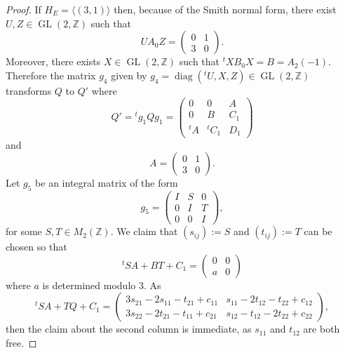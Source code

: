 \documentclass[11pt]{amsart}
\newcommand{\ZZ}{\mathbb{Z}}
\newcommand{\la}{\langle}
\newcommand{\ra}{\rangle}
\newcommand{\opn}{\operatorname}
\begin{document}
\begin{proof}
If $H_E = \la (3,1) \ra$ then, because of the Smith normal form, there exist $U, Z \in \opn{GL}(2, \ZZ)$ such that 
\begin{equation*}
U A_0 Z = 
\begin{pmatrix} 
0 & 1 \\ 
3 & 0 
\end{pmatrix}.
\end{equation*}
Moreover, there exists $X \in \opn{GL}(2, \ZZ)$ such that ${}^tX B_0 X = B = A_2(-1)$.
Therefore the matrix $g_4$ given by $g_4=\opn{diag}({}^t U, X, Z) \in \opn{GL}(2, \ZZ)$ transforms $Q$ to $Q'$ where
\begin{equation*}
Q' = 
{}^tg_1Qg_1 = 
\begin{pmatrix} 
0 & 0 & A \\ 
0 & B & C_1 \\ 
{}^t A & {}^t C_1 & D_1 
\end{pmatrix}
\end{equation*} 
and 
\begin{equation*}
A=
\begin{pmatrix} 
0 & 1 \\ 
3 & 0 
\end{pmatrix}.
\end{equation*}
Let $g_5$ be an integral matrix of the form 
\begin{equation*}
g_5=
\begin{pmatrix} 
I & S & 0 \\ 
0 & I & T \\ 
0 & 0 & I 
\end{pmatrix},
\end{equation*}
for some $S, T \in M_2(\ZZ)$. 
We claim that $(s_{ij}):=S$ and $(t_{ij}):=T$ can be chosen so that
\begin{equation*}
{}^t SA + BT + C_1 = 
\begin{pmatrix} 
0 & 0 \\ 
a & 0 
\end{pmatrix}
\end{equation*}
where $a$ is determined modulo 3. 
As 
\begin{equation}\label{normalformeq1}
{}^tSA + TQ + C_1= 
\begin{pmatrix} 3s_{21} - 2s_{11} - t_{21}  + c_{11} & s_{11} - 2t_{12} - t_{22} + c_{12} \\ 
3s_{22} - 2t_{21} - t_{11} + c_{21} & s_{12} - t_{12} - 2t_{22} + c_{22}
\end{pmatrix}, 
\end{equation}
then the claim about the second column is immediate, as $s_{11}$ and $t_{12}$ are both free. 


\end{proof}
\end{document}
